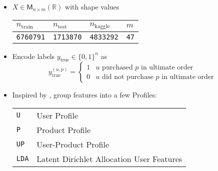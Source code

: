 \documentclass[handout]{beamer}
\begin{document}
\begin{frame}
 
\begin{itemize}
\item \(X \in \mathsf{M}_{n\times m} (\mathbb{R}) \) with shape values

\begin{table}
 \begin{tabular}{llll}
  \toprule
  \(n_\text{train}\) & \(n_\text{test}\) & \(n_\text{kaggle}\) &
  \(m\) \\
  \midrule
  \texttt{6760791}            & \texttt{1713870}           & \texttt{4833292}             & \texttt{47} \\
  \bottomrule
\end{tabular}
\end{table}
\vfill

\item Encode labels $y_\text{true} \in \{0,1\}^n$ as
\begin{equation*}
  y_\text{true}^{(u,p)} =
  \begin{cases}
    1  & \text{$u$ purchased $p$ in ultimate order}        \\
    0 & \text{$u$ did not purchase $p$ in ultimate order}
  \end{cases}
\end{equation*}
\vfill

\item Inspired by \cite{liuRepeatBuyerPrediction2016}, group features into a few Profiles:
\vfill
\begin{tabular}{ll}
  \toprule
  \texttt{U}   & User Profile\tabularnewline
  \texttt{P}   & Product Profile\tabularnewline
  \texttt{UP}  & User-Product Profile\tabularnewline
  \texttt{LDA} & Latent Dirichlet Allocation User Features\tabularnewline
  \bottomrule
\end{tabular}


\end{itemize}
 
 
 
\end{frame}
\end{document}
